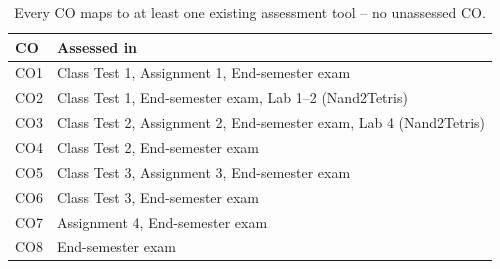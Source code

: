 \documentclass[11pt]{article}
\begin{document}
\begin{table}[h]
\centering
\small
\begin{tabular}{@{}l l@{}}
\toprule
CO & Assessed in \\
\midrule
CO1 & Class Test 1, Assignment 1, End-semester exam \\
CO2 & Class Test 1, End-semester exam, Lab 1--2 (Nand2Tetris) \\
CO3 & Class Test 2, Assignment 2, End-semester exam, Lab 4 (Nand2Tetris) \\
CO4 & Class Test 2, End-semester exam \\
CO5 & Class Test 3, Assignment 3, End-semester exam \\
CO6 & Class Test 3, End-semester exam \\
CO7 & Assignment 4, End-semester exam \\
CO8 & End-semester exam \\
\bottomrule
\end{tabular}
\caption{Every CO maps to at least one existing assessment tool -- no unassessed CO.}
\label{tab:assessed-in}
\end{table}
\end{document}
